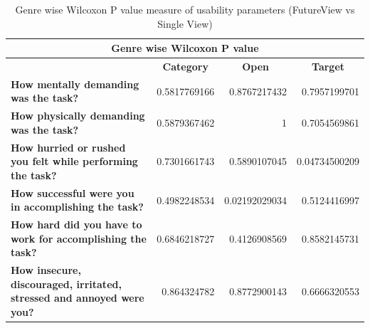 \documentclass[english]{tktltiki}
\begin{document}
\fi


\begin{table}
	\small
	\begin{center}
    \begin{tabular}{|p{6cm}|r|r|r|}
        \hline
        \multicolumn{4}{|c|}{\textbf{Genre wise Wilcoxon P value}} \\
        \hline
        
        \multicolumn{1}{|c|}{} & \multicolumn{1}{|c|}{\textbf{Category}} & \multicolumn{1}{|c|}{\textbf{Open}} & \multicolumn{1}{|c|}{\textbf{Target}} \\
        \hline
        
        
        
        \textbf{How mentally demanding was the task?} & 0.5817769166 & 0.8767217432 & 0.7957199701 \\
        \hline
        
        \textbf{How physically demanding was the task?} & 0.5879367462 & 1 & 0.7054569861 \\
        \hline
        
        \textbf{How hurried or rushed you felt while performing the task?} & 0.7301661743 & 0.5890107045 & 0.04734500209 \\
        \hline
        
        \textbf{How successful were you in accomplishing the task?} & 0.4982248534 & 0.02192029034 & 0.5124416997 \\
        \hline
        
        \textbf{How hard did you have to work for accomplishing the task?} & 0.6846218727 & 0.4126908569 & 0.8582145731 \\
        \hline
        
        \textbf{How insecure, discouraged, irritated, stressed and annoyed were you?} & 0.864324782 & 0.8772900143 & 0.6666320553 \\
        \hline
        
    \end{tabular}
	\end{center}
	\caption{Genre wise Wilcoxon P value measure of usability parameters (FutureView vs Single View)}
    \label{table:use_wilcoxon_genre}
\end{table}
\end{document}

